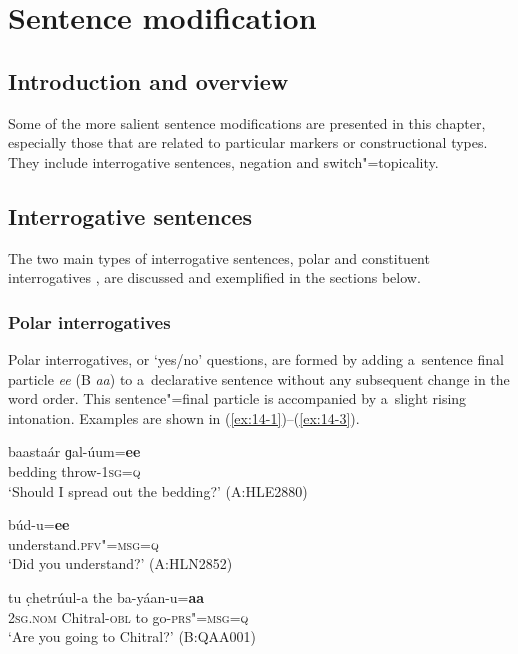 \chapter{Sentence modification}
\label{chap:14}

\section{Introduction and overview}
\label{sec:14-1}


Some of the more salient sentence modifications are presented in this chapter, especially those that are related to particular markers or constructional types. They include interrogative sentences, negation and switch"=topicality.


\section{Interrogative sentences}
\label{sec:14-2}


The two main types of interrogative sentences, polar and constituent interrogatives \citep[290--303]{koenigsiemund2007}, are discussed and exemplified in the sections below. 


\subsection{Polar interrogatives}
\label{subsec:14-2-1}


Polar interrogatives, or `yes/no' questions, are formed by adding a~sentence final particle \textit{ee} (B \textit{aa}) to a~declarative sentence without any subsequent change in the word order. This sentence"=final particle is accompanied by a~slight rising intonation. Examples are shown in (\ref{ex:14-1})--(\ref{ex:14-3}).

\begin{exe}
\ex
\label{ex:14-1}
\gll baastaár ɡal-úum=\textbf{ee}  \\
bedding throw-\textsc{1sg=q} \\
\glt `Should I spread out the bedding?' (A:HLE2880)

\ex
\label{ex:14-2}
\gll búd-u=\textbf{ee} \\
understand.\textsc{pfv"=msg=q} \\
\glt `Did you understand?' (A:HLN2852)

\ex
\label{ex:14-3}
\gll tu c̣hetrúul-a the ba-yáan-u=\textbf{aa} \\
\textsc{2sg.nom} Chitral-\textsc{obl} to go-\textsc{prs"=msg=q} \\
\glt `Are you going to Chitral?' (B:QAA001)
\end{exe}

